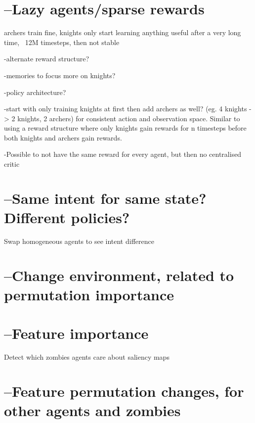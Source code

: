 \documentclass[UKenglish]{uiomasterthesis}
\begin{document}
\section{--Lazy agents/sparse rewards}
archers train fine, knights only start learning anything useful after a very long time, ~12M timesteps, then not stable

-alternate reward structure?

-memories to focus more on knights?

-policy architecture?

-start with only training knights at first then add archers as well? (eg. 4 knights -> 2 knights, 2 archers) for consistent action and observation space. Similar to using a reward structure where only knights gain rewards for n timesteps before both knights and archers gain rewards. 

-Possible to not have the same reward for every agent, but then no centralised critic

\section{--Same intent for same state? Different policies?}
Swap homogeneous agents to see intent difference

\section{--Change environment, related to permutation importance}

\section{--Feature importance}
Detect which zombies agents care about
saliency maps

\section{--Feature permutation changes, for other agents and zombies}
{}

\end{document}
